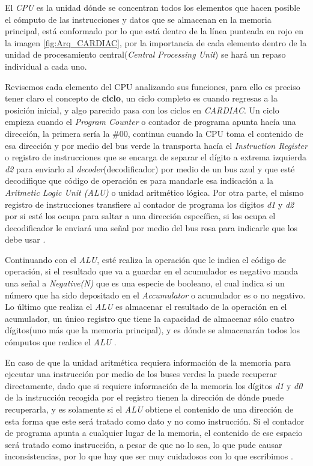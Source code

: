 \documentclass[letterpaper,12pt,oneside]{book}
\begin{document}
	
	
	El \textit{CPU} es la unidad dónde se concentran todos los elementos que hacen posible el cómputo de las instrucciones y datos
	que se almacenan en la memoria principal,
	está conformado por lo que está dentro de la línea punteada en rojo en la imagen \ref{fig:Arq_CARDIAC}, por la importancia
	de cada elemento dentro de la unidad de procesamiento central(\textit{Central Processing Unit}) se hará un repaso individual a cada uno.
	
	Revisemos cada elemento del CPU analizando sus funciones, para ello es preciso tener claro el concepto de \textbf{ciclo}, un
	ciclo completo es cuando regresas a la posición inicial, y algo parecido pasa con los ciclos en \textit{CARDIAC}. Un ciclo empieza
	cuando el \textit{Program Counter} o contador de programa apunta hacía una dirección, la primera sería la \#00, continua
	cuando la CPU toma el contenido de esa dirección y por medio del bus verde la transporta hacía el \textit{Instruction Register} o
	registro de instrucciones que se encarga de separar el dígito a extrema izquierda \textit{d2} para enviarlo al \textit{decoder}(decodificador)
	por medio de un bus azul y que esté decodifique que código de operación es para mandarle esa indicación a la \textit{Aritmetic Logic Unit (ALU)} o
	unidad aritmético lógica. Por otra parte, el mismo registro de instrucciones transfiere al contador de programa los dígitos \textit{d1} y \textit{d2}
	por si esté los ocupa para saltar a una dirección específica, si los ocupa el decodificador le enviará una señal por medio 
	del bus rosa para indicarle que los debe usar \cite{hegelbarger_instruction_1968}.
	
	Continuando con el \textit{ALU}, esté realiza la operación que le indica el código de operación, si el resultado que va a guardar
	en el acumulador es negativo manda una señal a \textit{Negative(N)} que es una especie de booleano, el cual indica si un número 
	que ha sido depositado en el \textit{Accumulator} o acumulador es
	o no negativo. Lo último que realiza el \textit{ALU} es almacenar el resultado de la operación en el  acumulador, un único registro
	que tiene la capacidad de almacenar sólo cuatro dígitos(uno más que la memoria principal), y es dónde se almacenarán todos
	los cómputos que realice el \textit{ALU} \cite{hegelbarger_instruction_1968}. 
	
	En caso de que la unidad aritmética requiera información
	de la memoria  para ejecutar una instrucción por medio de los buses verdes la puede recuperar directamente, dado que si requiere información
	de la memoria los dígitos \textit{d1} y \textit{d0} de la instrucción recogida por el registro tienen la dirección de dónde puede recuperarla, y es solamente
	si el \textit{ALU} obtiene el contenido de una dirección de esta forma que este será tratado como dato y no como instrucción. Si el contador de programa apunta a cualquier lugar de la memoria, el contenido de ese espacio será tratado como instrucción, a pesar
	de que no lo sea, lo que pude causar inconsistencias, por lo que hay que ser muy cuidadosos con lo que escribimos \cite{hegelbarger_instruction_1968}.
	
\end{document}
